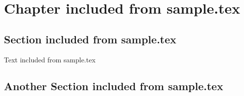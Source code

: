\chapter{Chapter included from sample.tex}

\section{Section included from sample.tex}

Text included from sample.tex


\newpage


\section{Another Section included from sample.tex}

